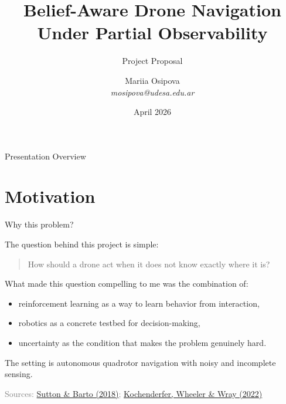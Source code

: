 \documentclass[11pt]{beamer}
\title{Belief-Aware Drone Navigation Under Partial Observability}
\subtitle{Project Proposal}
\author[M. Osipova]{Mariia Osipova\\[3pt]\textit{mosipova@udesa.edu.ar}}
\institute{\\[12pt]Under the supervision of Juan Felipe Perdomo}
\date[Apr 2026]{April 2026}
\newcommand{\srcSuttonBarto}{\href{http://incompleteideas.net/book/the-book.html}{Sutton \& Barto (2018)}}
\newcommand{\srcKochenderferADM}{\href{https://algorithmsbook.com}{Kochenderfer, Wheeler \& Wray (2022)}}
\newcommand{\SourceLine}[1]{\vfill{\tiny\textcolor{gray}{Sources: #1}}}
\begin{document}

\begin{frame}
    \titlepage
\end{frame}


\begin{frame}{Presentation Overview}
  \tableofcontents
\end{frame}


\section{Motivation}


\begin{frame}{Why this problem?}

The question behind this project is simple:

\medskip
\begin{quote}
How should a drone act when it does not know exactly where it is?
\end{quote}

\medskip
What made this question compelling to me was the combination of:
\begin{itemize}
  \item reinforcement learning as a way to learn behavior from interaction,
  \item robotics as a concrete testbed for decision-making,
  \item uncertainty as the condition that makes the problem genuinely hard.
\end{itemize}

The setting is autonomous quadrotor navigation with noisy and incomplete sensing.

\SourceLine{\srcSuttonBarto; \srcKochenderferADM}
\end{frame}

\end{document}
